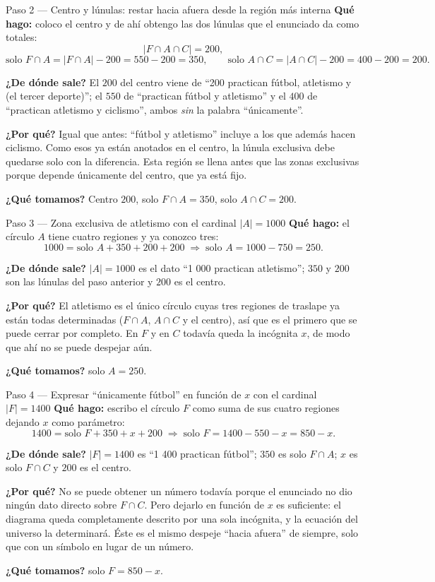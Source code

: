 \documentclass[11pt]{article}
\begin{document}
\begin{paso}{Paso 2 --- Centro y lúnulas: restar hacia afuera desde la región más interna}
\textbf{Qué hago:} coloco el centro y de ahí obtengo las dos lúnulas que el enunciado da como totales:
\[
|F\cap A\cap C| = 200,
\]
\[
\text{solo }F\cap A = |F\cap A| - 200 = 550-200 = 350,
\qquad
\text{solo }A\cap C = |A\cap C| - 200 = 400-200 = 200 .
\]

\textbf{¿De dónde sale?} El $200$ del centro viene de ``200 practican fútbol, atletismo y (el tercer
deporte)''; el $550$ de ``practican fútbol y atletismo'' y el $400$ de ``practican atletismo y ciclismo'',
ambos \emph{sin} la palabra ``únicamente''.

\textbf{¿Por qué?} Igual que antes: ``fútbol y atletismo'' incluye a los que además hacen ciclismo. Como
esos ya están anotados en el centro, la lúnula exclusiva debe quedarse solo con la diferencia. Esta región
se llena antes que las zonas exclusivas porque depende únicamente del centro, que ya está fijo.

\textbf{¿Qué tomamos?} Centro $200$, solo $F\cap A=350$, solo $A\cap C=200$.
\end{paso}

\begin{paso}{Paso 3 --- Zona exclusiva de atletismo con el cardinal $|A|=1000$}
\textbf{Qué hago:} el círculo $A$ tiene cuatro regiones y ya conozco tres:
\[
1000 = \text{solo }A + 350 + 200 + 200 \;\Longrightarrow\; \text{solo }A = 1000-750 = 250 .
\]

\textbf{¿De dónde sale?} $|A|=1000$ es el dato ``1 000 practican atletismo''; $350$ y $200$ son las
lúnulas del paso anterior y $200$ es el centro.

\textbf{¿Por qué?} El atletismo es el único círculo cuyas tres regiones de traslape ya están todas
determinadas ($F\cap A$, $A\cap C$ y el centro), así que es el primero que se puede cerrar por completo.
En $F$ y en $C$ todavía queda la incógnita $x$, de modo que ahí no se puede despejar aún.

\textbf{¿Qué tomamos?} solo $A = 250$.
\end{paso}

\begin{paso}{Paso 4 --- Expresar ``únicamente fútbol'' en función de $x$ con el cardinal $|F|=1400$}
\textbf{Qué hago:} escribo el círculo $F$ como suma de sus cuatro regiones dejando $x$ como parámetro:
\[
1400 = \text{solo }F + 350 + x + 200 \;\Longrightarrow\; \text{solo }F = 1400-550-x = 850 - x .
\]

\textbf{¿De dónde sale?} $|F|=1400$ es ``1 400 practican fútbol''; $350$ es solo $F\cap A$; $x$ es solo
$F\cap C$ y $200$ es el centro.

\textbf{¿Por qué?} No se puede obtener un número todavía porque el enunciado no dio ningún dato directo
sobre $F\cap C$. Pero dejarlo en función de $x$ es suficiente: el diagrama queda completamente descrito
por una sola incógnita, y la ecuación del universo la determinará. Éste es el mismo despeje ``hacia
afuera'' de siempre, solo que con un símbolo en lugar de un número.

\textbf{¿Qué tomamos?} solo $F = 850-x$.
\end{paso}
\end{document}
